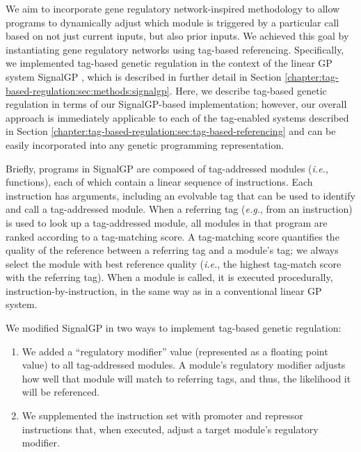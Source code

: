 We aim to incorporate gene regulatory network-inspired methodology to allow programs to dynamically adjust which module is triggered by a particular call based on not just current inputs, but also prior inputs.
We achieved this goal by instantiating gene regulatory networks using tag-based referencing.
Specifically, we implemented tag-based genetic regulation in the context of the linear GP system SignalGP \citep{lalejini_evolving_2018}, which is described in further detail in Section \ref{chapter:tag-based-regulation:sec:methods:signalgp}.
Here, we describe tag-based genetic regulation in terms of our SignalGP-based implementation; however, our overall approach is immediately applicable to each of the tag-enabled systems described in Section \ref{chapter:tag-based-regulation:sec:tag-based-referencing} and can be easily incorporated into any genetic programming representation.

Briefly, programs in SignalGP are composed of tag-addressed modules (\textit{i.e.}, functions), each of which contain a linear sequence of instructions. 
Each instruction has arguments, including an evolvable tag that can be used to identify and call a tag-addressed module.
When a referring tag (\textit{e.g.}, from an instruction) is used to look up a tag-addressed module, all modules in that program are ranked according to a tag-matching score. 
A tag-matching score quantifies the quality of the reference between a referring tag and a module's tag; we always select the module with best reference quality (\textit{i.e.}, the highest tag-match score with the referring tag).
When a module is called, it is executed procedurally, instruction-by-instruction, in the same way as in a conventional linear GP system. 



We modified SignalGP in two ways to implement tag-based genetic regulation: 

\begin{enumerate}
    \item We added a ``regulatory modifier'' value (represented as a floating point value) to all tag-addressed modules. A module's regulatory modifier adjusts how well that module will match to referring tags, and thus, the likelihood it will be referenced.
    \item We supplemented the instruction set with promoter and repressor instructions that, when executed, adjust a target module's regulatory modifier. 
\end{enumerate} 

